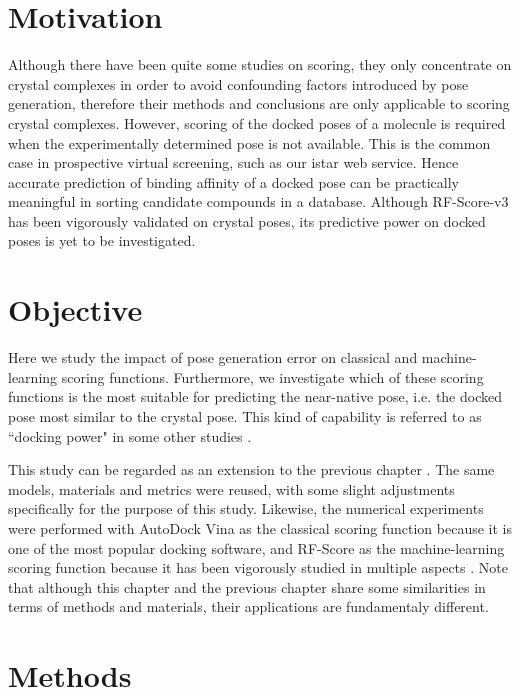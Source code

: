 \section{Motivation}

Although there have been quite some studies \citep{1432,1433} on scoring, they only concentrate on crystal complexes in order to avoid confounding factors introduced by pose generation, therefore their methods and conclusions are only applicable to scoring crystal complexes. However, scoring of the docked poses of a molecule is required when the experimentally determined pose is not available. This is the common case in prospective virtual screening, such as our istar web service. Hence accurate prediction of binding affinity of a docked pose can be practically meaningful in sorting candidate compounds in a database. Although RF-Score-v3 has been vigorously validated on crystal poses, its predictive power on docked poses is yet to be investigated.

\section{Objective}

Here we study the impact of pose generation error on classical and machine-learning scoring functions. Furthermore, we investigate which of these scoring functions is the most suitable for predicting the near-native pose, i.e. the docked pose most similar to the crystal pose. This kind of capability is referred to as ``docking power" in some other studies \citep{1411}.

This study can be regarded as an extension to the previous chapter \citep{1433}. The same models, materials and metrics were reused, with some slight adjustments specifically for the purpose of this study. Likewise, the numerical experiments were performed with AutoDock Vina \citep{595} as the classical scoring function because it is one of the most popular docking software, and RF-Score \citep{564} as the machine-learning scoring function because it has been vigorously studied in multiple aspects \citep{1281,1362,1370}. Note that although this chapter and the previous chapter share some similarities in terms of methods and materials, their applications are fundamentaly different.

\section{Methods}


